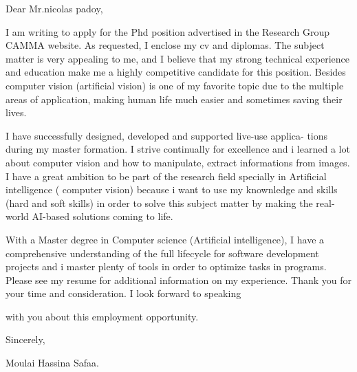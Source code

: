 \documentclass[11pt,a4paper]{report}
\begin{document}



Dear Mr.nicolas padoy,

I am writing to apply for the Phd position advertised in the 
Research Group CAMMA website. As requested, I enclose my cv and diplomas.
The subject matter is very appealing to me, and I believe that my strong
technical experience and education make me a highly competitive candidate
for this position. Besides computer vision (artificial vision) is one of my favorite topic due to the multiple areas of application, making human life much easier and sometimes saving their lives.


I have successfully designed, developed and supported live-use applica-
tions during my master formation.
I strive continually for excellence and i learned a lot about computer vision
and how to manipulate, extract informations from images.
I have a great ambition to be part of the research field specially in Artificial intelligence ( computer vision) because i want to use  my knownledge and skills (hard and soft skills) in order to solve this subject matter by making the real-world AI-based solutions coming to life.


With a Master degree in Computer science (Artificial intelligence), I have
a comprehensive understanding of the full lifecycle for software development
projects and i master plenty of tools in order to optimize tasks in programs.
Please see my resume for additional information on my experience.
Thank you for your time and consideration. I look forward to speaking

with you about this employment opportunity.

Sincerely,


Moulai Hassina Safaa.
\end{document}
